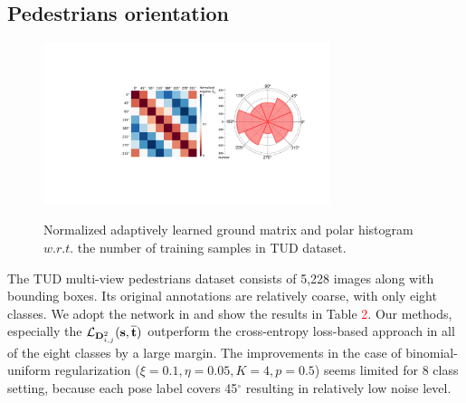 \subsection{Pedestrians orientation}
 
 
\begin{figure}[t]
\centering
\includegraphics[width=8.4cm]{fig//fig4.pdf}\\
\caption{Normalized adaptively learned ground matrix and polar histogram $w.r.t.$ the number of training samples in TUD dataset.}\label{fig:4}
\end{figure}
 
 

 
 

 

 

The TUD multi-view pedestrians dataset \cite{andriluka2010monocular} consists of 5,228 images along with bounding boxes. Its original annotations are relatively coarse, with only eight classes. We adopt the network in \cite{raza2018appearance} and show the results in Table \textcolor{red}{2}. Our methods, especially the $\mathcal{L}_{{\rm\textbf{D}}_{i,j}^2}{(\rm{{\textbf{s},\overline{\textbf{t}}}})}$ outperform the cross-entropy loss-based approach in all of the eight classes by a large margin. The improvements in the case of binomial-uniform regularization ($\xi=0.1,\eta=0.05,K=4,p=0.5$) seems limited for 8 class setting, because each pose label covers 45$^\circ$ resulting in relatively low noise level. 





